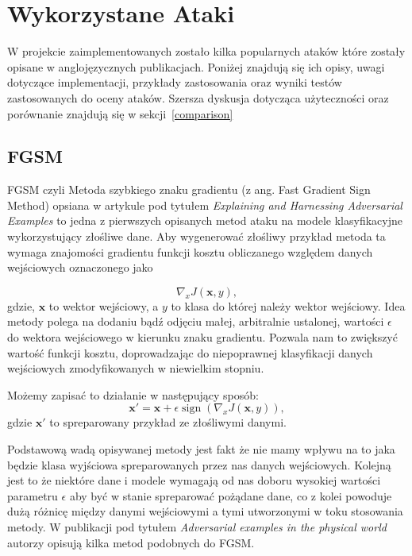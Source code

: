 \documentclass[
    left=2.5cm,         %
    right=2.5cm,        %
    top=2.5cm,          %
    bottom=3cm,         %
    bindingoffset=6mm,  %
    nohyphenation=false %
]{eiti/eiti-thesis}
\renewcommand{\vec}[1]{\mathbf{#1}}
\begin{document}
\newpage



\section{Wykorzystane Ataki}\label{sec:used_attacks}
W projekcie zaimplementowanych zostało kilka popularnych ataków które zostały opisane w anglojęzycznych publikacjach.
Poniżej znajdują się ich opisy, uwagi dotyczące implementacji, przykłady zastosowania oraz wyniki testów
zastosowanych do oceny ataków. Szersza dyskusja dotycząca użyteczności oraz porównanie znajdują się w sekcji~\ref{comparison}

\subsection{FGSM}
    FGSM czyli Metoda szybkiego znaku gradientu (z ang. Fast Gradient Sign Method) opsiana w artykule
    pod tytułem \textit{Explaining and Harnessing Adversarial Examples}\cite{harnessing} to jedna z pierwszych
    opisanych metod ataku na modele klasyfikacyjne wykorzystujący złośliwe dane.
    Aby wygenerować złośliwy przykład metoda ta wymaga znajomości gradientu funkcji kosztu obliczanego względem danych
    wejściowych oznaczonego jako

    \begin{equation}
        \nabla_{x} J(\vec{x}, y),
    \end{equation}
    gdzie, $\vec{x}$ to wektor wejściowy, a $y$ to klasa do której należy wektor wejściowy.
    Idea metody polega na dodaniu bądź odjęciu małej, arbitralnie ustalonej, wartości  \(\epsilon\) do
    wektora wejściowego w kierunku znaku gradientu. Pozwala nam to zwiększyć wartość funkcji kosztu,
    doprowadzając do niepoprawnej klasyfikacji danych wejściowych zmodyfikowanych w niewielkim stopniu.


    Możemy zapisać to działanie w następujący sposób:
    \begin{equation}
    \vec{x'} = \vec{x} + \epsilon\operatorname{sign}(\nabla_{x} J(\vec{x}, y)),
    \end{equation}
    gdzie $\vec{x'}$ to spreparowany przykład ze złośliwymi danymi.

    Podstawową wadą opisywanej metody jest fakt że nie mamy wpływu na to jaka będzie klasa wyjściowa
    spreparowanych przez nas danych wejściowych. Kolejną jest to że niektóre dane i modele wymagają od nas
    doboru wysokiej wartości parametru $\epsilon$ aby być w stanie spreparować pożądane dane, co z kolei powoduje dużą
    różnicę między danymi wejściowymi a tymi utworzonymi w toku stosowania metody.
    W publikacji pod tytułem \textit{Adversarial examples in the physical world}\cite{DBLP:journals/corr/KurakinGB16}
    autorzy opisują kilka metod podobnych do FGSM.
\end{document}

